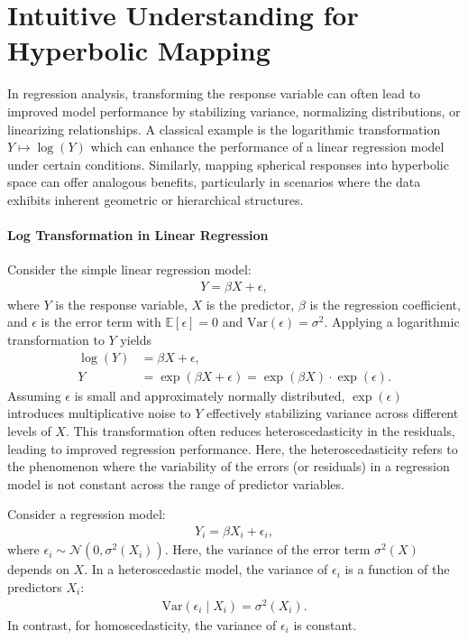 \section{Intuitive Understanding for Hyperbolic Mapping}
\label{apd:intuitive_understanding_for_hyperbolic_mapping}
In regression analysis, transforming the response variable can often lead to improved model performance by stabilizing variance, normalizing distributions, or linearizing relationships.
A classical example is the logarithmic transformation $Y \mapsto \log(Y)$ which can enhance the performance of a linear regression model under certain conditions.
Similarly, mapping spherical responses into hyperbolic space can offer analogous benefits, particularly in scenarios where the data exhibits inherent geometric or hierarchical structures.

\paragraph{Log Transformation in Linear Regression}
Consider the simple linear regression model:
\begin{align*}
    Y = \beta X + \epsilon,
\end{align*}
where $Y$ is the response variable, $X$ is the predictor, $\beta$ is the regression coefficient, and $\epsilon$ is the error term with $\mathbb{E}[\epsilon] = 0$ and $\mathrm{Var}(\epsilon) = \sigma^2$.
Applying a logarithmic transformation to $Y$ yields
\begin{align*}
    \log(Y) &= \beta X + \epsilon, \\
    Y &= \exp(\beta X + \epsilon) = \exp(\beta X)\cdot\exp(\epsilon).
\end{align*}
Assuming $\epsilon$ is small and approximately normally distributed, $\exp(\epsilon)$ introduces multiplicative noise to $Y$ effectively stabilizing variance across different levels of $X$.
This transformation often reduces heteroscedasticity in the residuals, leading to improved regression performance.
Here, the heteroscedasticity refers to the phenomenon where the variability of the errors (or residuals) in a regression model is not constant across the range of predictor variables.

\begin{definition}[Heteroscedasticity]
    \label{def:heteroscedasticity}
    Consider a regression model:
    \begin{align*}
        Y_i = \beta X_i + \epsilon_i,
    \end{align*}
    where $\epsilon_i \sim \mathcal{N}(0, \sigma^2(X_i))$.
    Here, the variance of the error term $\sigma^2(X)$ depends on $X$.
    In a heteroscedastic model, the variance of $\epsilon_i$ is a function of the predictors $X_i$:
    \begin{align*}
        \mathrm{Var}(\epsilon_i \mid X_i) = \sigma^2(X_i).
    \end{align*}
    In contrast, for homoscedasticity, the variance of $\epsilon_i$ is constant.
\end{definition}

